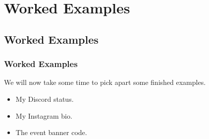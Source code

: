 \documentclass[xcolor]{beamer}
\begin{document}
\section{Worked Examples}

\subsection{Worked Examples}

\begin{frame}
	\frametitle{Worked Examples}
	\pause
	
	We will now take some time to pick apart some finished examples.
	\pause
	
	\begin{itemize}
		\item My Discord status.
		\pause
		
		\item My Instagram bio.
		\pause
		
		\item The event banner code.
	\end{itemize}
\end{frame}
\end{document}
